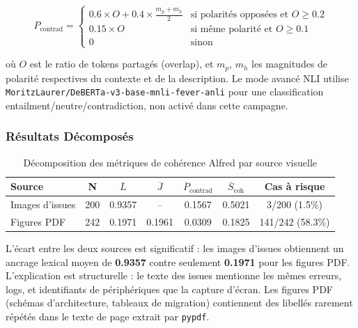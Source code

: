 \documentclass[12pt,a4paper]{report}
\begin{document}
\begin{equation}
P_{\text{contrad}} =
\begin{cases}
0.6 \times O + 0.4 \times \frac{m_p + m_h}{2} & \text{si polarités opposées et } O \geq 0.2 \\
0.15 \times O & \text{si même polarité et } O \geq 0.1 \\
0 & \text{sinon}
\end{cases}
\label{eq:alfred_contradiction_lite}
\end{equation}

où $O$ est le ratio de tokens partagés (overlap), et $m_p$, $m_h$ les magnitudes de polarité respectives du contexte et de la description. Le mode avancé NLI utilise \texttt{MoritzLaurer/DeBERTa-v3-base-mnli-fever-anli} pour une classification entailment/neutre/contradiction, non activé dans cette campagne.

\subsubsection{Résultats Décomposés}

\begin{table}[H]
\centering
\begin{tabular}{lcccccc}
\toprule
\textbf{Source} & \textbf{N} & $\overline{L}$ & $\overline{J}$ & $\overline{P}_{\text{contrad}}$ & $\overline{S}_{\text{coh}}$ & \textbf{Cas à risque} \\
\midrule
Images d'issues & 200 & 0.9357 & -- & 0.1567 & 0.5021 & 3/200 (1.5\%) \\
Figures PDF & 242 & 0.1971 & 0.1961 & 0.0309 & 0.1825 & 141/242 (58.3\%) \\
\bottomrule
\end{tabular}
\caption{Décomposition des métriques de cohérence Alfred par source visuelle}
\label{tab:alfred_coherence_decomposition}
\end{table}

L'écart entre les deux sources est significatif : les images d'issues obtiennent un ancrage lexical moyen de \textbf{0.9357} contre seulement \textbf{0.1971} pour les figures PDF. L'explication est structurelle : le texte des issues mentionne les mêmes erreurs, logs, et identifiants de périphériques que la capture d'écran. Les figures PDF (schémas d'architecture, tableaux de migration) contiennent des libellés rarement répétés dans le texte de page extrait par \texttt{pypdf}.
\end{document}
